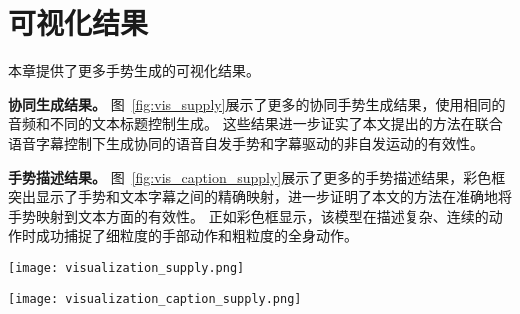 
\chapter{可视化结果}
\label{sec:appendix_vis}
本章提供了更多手势生成的可视化结果。

\textbf{协同生成结果。}
图~\ref{fig:vis_supply}展示了更多的协同手势生成结果，使用相同的音频和不同的文本标题控制生成。
这些结果进一步证实了本文提出的方法在联合语音字幕控制下生成协同的语音自发手势和字幕驱动的非自发运动的有效性。

\textbf{手势描述结果。}
图~\ref{fig:vis_caption_supply}展示了更多的手势描述结果，彩色框突出显示了手势和文本字幕之间的精确映射，进一步证明了本文的方法在准确地将手势映射到文本方面的有效性。
正如彩色框显示，该模型在描述复杂、连续的动作时成功捕捉了细粒度的手部动作和粗粒度的全身动作。

\begin{figure*}[t]
  \centering
  \texttt{[image: visualization\_supply.png]}
  \caption{协同手势生成结果。}
  \label{fig:vis_supply}
\end{figure*}

\begin{figure*}[t]
  \centering
  \texttt{[image: visualization\_caption\_supply.png]}
  \caption{手势描述结果。}%
  \label{fig:vis_caption_supply}
\end{figure*}








